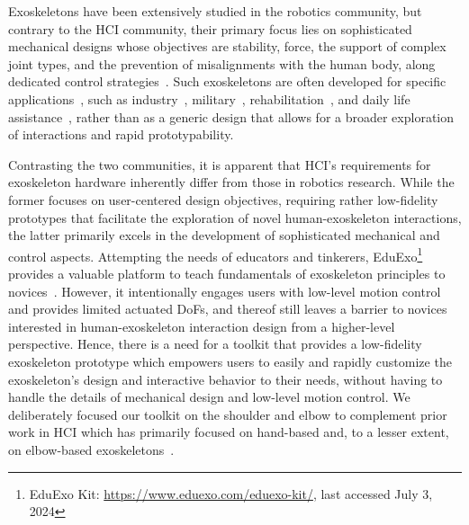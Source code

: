 Exoskeletons have been extensively studied in the robotics community, but contrary to the HCI community, their primary focus lies on sophisticated mechanical designs whose objectives are stability, force, the support of complex joint types, and the prevention of misalignments with the human body, along dedicated control strategies~\cite{gull_2020}.
Such exoskeletons are often developed for specific applications~\cite{gull_2020}, such as  industry~\cite{bogue_2018}, military~\cite{proud_2022}, rehabilitation~\cite{proietti_2016}, and daily life assistance~\cite{jung_2018, kapsalyamov_2020}, rather than as a generic design that allows for a broader exploration of interactions and rapid prototypability.

Contrasting the two communities, it is apparent that HCI's requirements for exoskeleton hardware inherently differ from those in robotics research. While the former focuses on user-centered design objectives, requiring rather low-fidelity prototypes that facilitate the exploration of novel human-exoskeleton interactions, the latter primarily excels in the development of sophisticated mechanical and control aspects. 
Attempting the needs of educators and tinkerers, EduExo\footnote{EduExo Kit: \url{https://www.eduexo.com/eduexo-kit/}, last accessed July 3, 2024} provides a valuable platform to teach fundamentals of exoskeleton principles to novices~\cite{tashi_2024,bartenbach_2020}.
However, it intentionally engages users with low-level motion control and provides limited actuated DoFs, and thereof still leaves a barrier to novices interested in human-exoskeleton interaction design from a higher-level perspective. Hence, there is a need for a toolkit that provides a low-fidelity exoskeleton prototype which empowers users to easily and rapidly customize the exoskeleton's design and interactive behavior to their needs, without having to handle the details of mechanical design and low-level motion control. 
We deliberately focused our toolkit on the shoulder and elbow to complement prior work in HCI which has primarily focused on hand-based and, to a lesser extent, on elbow-based exoskeletons~\cite{gu_2016,teng_2022,nishida_2022,li_2023}. 

